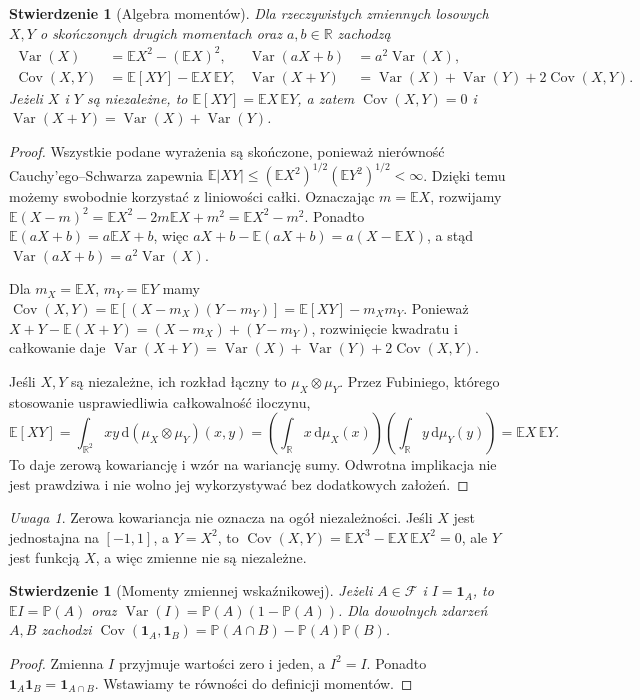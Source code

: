\documentclass[11pt,a4paper,oneside]{report}
\numberwithin{equation}{chapter}
\theoremstyle{plain}
\newtheorem{stwierdzenie}[twierdzenie]{Stwierdzenie}
\theoremstyle{definition}
\theoremstyle{remark}
\newtheorem{uwaga}{Uwaga}[chapter]
\newcommand{\R}{\mathbb{R}}
\newcommand{\Prob}{\mathbb{P}}
\newcommand{\E}{\mathbb{E}}
\newcommand{\Var}{\operatorname{Var}}
\newcommand{\Cov}{\operatorname{Cov}}
\newcommand{\ind}[1]{\mathbf{1}_{#1}}
\newcommand{\dd}{\mathrm{d}}
\begin{document}
\begin{stwierdzenie}[Algebra momentów]
Dla rzeczywistych zmiennych losowych $X,Y$ o skończonych
drugich momentach oraz $a,b\in\R$ zachodzą
\begin{align*}
\Var(X)&=\E X^2-(\E X)^2, &
\Var(aX+b)&=a^2\Var(X),\\
\Cov(X,Y)&=\E[XY]-\E X\,\E Y, &
\Var(X+Y)&=\Var(X)+\Var(Y)+2\Cov(X,Y).
\end{align*}
Jeżeli $X$ i $Y$ są niezależne, to $\E[XY]=\E X\,\E Y$,
a zatem $\Cov(X,Y)=0$ i $\Var(X+Y)=\Var(X)+\Var(Y)$.
\end{stwierdzenie}
\begin{proof}
Wszystkie podane wyrażenia są skończone,
ponieważ nierówność Cauchy'ego--Schwarza zapewnia
$\E|XY|\leq(\E X^2)^{1/2}(\E Y^2)^{1/2}<\infty$.
Dzięki temu możemy swobodnie korzystać z liniowości całki.
Oznaczając $m=\E X$, rozwijamy
$\E(X-m)^2=\E X^2-2m\E X+m^2=\E X^2-m^2$.
Ponadto $\E(aX+b)=a\E X+b$, więc
$aX+b-\E(aX+b)=a(X-\E X)$,
a stąd $\Var(aX+b)=a^2\Var(X)$.

Dla $m_X=\E X$, $m_Y=\E Y$ mamy
$\Cov(X,Y)=\E[(X-m_X)(Y-m_Y)]
=\E[XY]-m_Xm_Y$.
Ponieważ
$X+Y-\E(X+Y)=(X-m_X)+(Y-m_Y)$,
rozwinięcie kwadratu i całkowanie daje
$\Var(X+Y)=\Var(X)+\Var(Y)+2\Cov(X,Y)$.

Jeśli $X,Y$ są niezależne, ich rozkład łączny to
$\mu_X\otimes\mu_Y$. Przez Fubiniego, którego
stosowanie usprawiedliwia całkowalność iloczynu,
\[
\E[XY]=\int_{\R^2}xy\,\dd(\mu_X\otimes\mu_Y)(x,y)
=\left(\int_\R x\,\dd\mu_X(x)\right)
 \left(\int_\R y\,\dd\mu_Y(y)\right)
=\E X\,\E Y.
\]
To daje zerową kowariancję i wzór na wariancję sumy.
Odwrotna implikacja nie jest prawdziwa i nie wolno
jej wykorzystywać bez dodatkowych założeń.
\end{proof}

\begin{uwaga}
Zerowa kowariancja nie oznacza na ogół niezależności.
Jeśli $X$ jest jednostajna na $[-1,1]$, a $Y=X^2$, to
$\Cov(X,Y)=\E X^3-\E X\,\E X^2=0$,
ale $Y$ jest funkcją $X$, a więc zmienne nie są niezależne.
\end{uwaga}

\begin{stwierdzenie}[Momenty zmiennej wskaźnikowej]
Jeżeli $A\in\mathcal F$ i $I=\ind{A}$, to
$\E I=\Prob(A)$ oraz
$\Var(I)=\Prob(A)(1-\Prob(A))$.
Dla dowolnych zdarzeń $A,B$ zachodzi
$\Cov(\ind{A},\ind{B})=\Prob(A\cap B)-\Prob(A)\Prob(B)$.
\end{stwierdzenie}
\begin{proof}
Zmienna $I$ przyjmuje wartości zero i jeden, a $I^2=I$.
Ponadto $\ind{A}\ind{B}=\ind{A\cap B}$.
Wstawiamy te równości do definicji momentów.
\end{proof}
\end{document}

